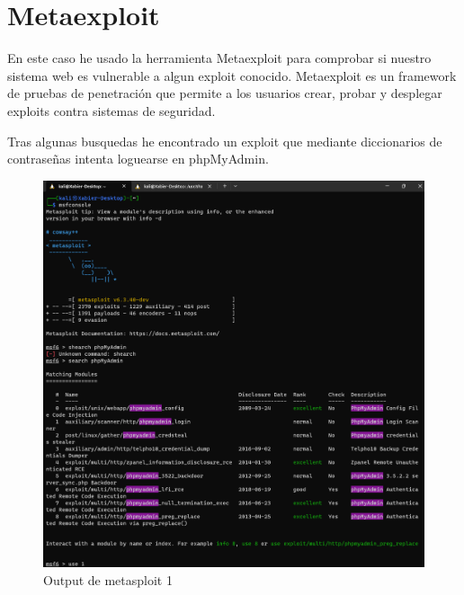 \documentclass{report}
\begin{document}
        \section{Metaexploit}
            En este caso he usado la herramienta Metaexploit para comprobar si nuestro sistema web es vulnerable a algun exploit conocido.
            Metaexploit es un framework de pruebas de penetración que permite a los usuarios crear, probar y desplegar exploits contra sistemas de seguridad.
            
            Tras algunas busquedas he encontrado un exploit que mediante diccionarios de contraseñas intenta loguearse en phpMyAdmin.
            \begin{figure}[H]
                \centering
                \includegraphics[width=\textwidth]{./img/audit1/msf1.png}
                \caption{Output de metasploit 1}
            \end{figure}
\end{document}
